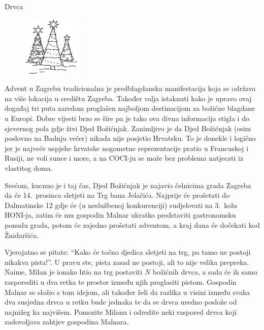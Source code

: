 \begin{statement}[
  problempoints=110,
  timelimit=1 sekunda,
  memorylimit=512 MiB,
]{Drvca}

\setlength\intextsep{-0.1cm}
\begin{figure}
\centering
\includegraphics[width=0.25\textwidth]{img/drvca.png}
\end{figure}

Advent u Zagrebu tradicionalna je predblagdanska manifestacija koja se održava
na više lokacija u središtu Zagreba. Također valja istaknuti kako je upravo
ovaj događaj tri puta zaredom proglašen najboljom destinacijom za božićne
blagdane u Europi. Dobre vijesti brzo se šire pa je tako ova divna informacija
stigla i do sjevernog pola gdje živi Djed Božićnjak. Zanimljivo je da Djed
Božićnjak (osim poslovno na Badnju večer) nikada nije posjetio Hrvatsku. To je
donekle i logično jer je najveće uspjehe hrvatske nogometne reprezentacije
pratio u Francuskoj i Rusiji, ne voli sunce i more, a na COCI-ju se može bez
problema natjecati iz vlastitog doma.

Srećom, kucnuo je i taj čas, Djed Božićnjak je najavio čelnicima grada Zagreba
da će 14.\ prosinca sletjeti na Trg bana Jelačića. Najprije će prošetati do
Dalmatinske 12 gdje će (u neslužbenoj konkurenciji) sudjelovati na 3.\ kolu
HONI-ja, zatim će mu gospodin Malnar ukratko predstaviti gastronomsku ponudu
grada, potom će zajedno prošetati adventom, a kraj dana će dočekati kod
Žnidaršića.

Vjerojatno se pitate: ``Kako će točno djedica sletjeti na trg, pa tamo ne
postoji nikakva pista!''. U pravu ste, pista zasad ne postoji, ali to nije
velika prepreka. Naime, Milan je ionako htio na trg postaviti $N$ božićnih
drvca, a sada će ih samo rasporediti u dva retka te prostor između njih
proglasiti pistom. Gospodin Malnar se složio s tom idejom, ali također želi da
razlika u visini između svaka dva susjedna drvca u retku bude jednaka te da se
drvca uredno poslože od najnižeg ka najvišem. Pomozite Milanu i odredite neki
raspored drvca koji zadovoljava zahtjev gospodina Malnara.


\end{statement}
